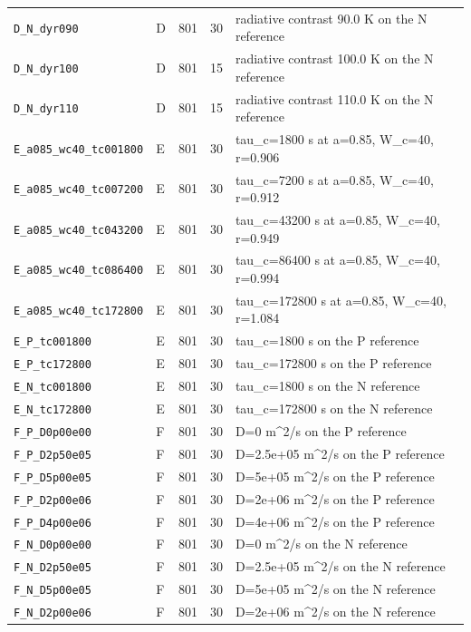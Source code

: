 {\begin{longtable}{llrrp{7.0cm}}
\texttt{D\_N\_dyr090} & D & 801 & 30 & radiative contrast 90.0 K on the N reference\\
\texttt{D\_N\_dyr100} & D & 801 & 15 & radiative contrast 100.0 K on the N reference\\
\texttt{D\_N\_dyr110} & D & 801 & 15 & radiative contrast 110.0 K on the N reference\\
\texttt{E\_a085\_wc40\_tc001800} & E & 801 & 30 & tau\_c=1800 s at a=0.85, W\_c=40, r=0.906\\
\texttt{E\_a085\_wc40\_tc007200} & E & 801 & 30 & tau\_c=7200 s at a=0.85, W\_c=40, r=0.912\\
\texttt{E\_a085\_wc40\_tc043200} & E & 801 & 30 & tau\_c=43200 s at a=0.85, W\_c=40, r=0.949\\
\texttt{E\_a085\_wc40\_tc086400} & E & 801 & 30 & tau\_c=86400 s at a=0.85, W\_c=40, r=0.994\\
\texttt{E\_a085\_wc40\_tc172800} & E & 801 & 30 & tau\_c=172800 s at a=0.85, W\_c=40, r=1.084\\
\texttt{E\_P\_tc001800} & E & 801 & 30 & tau\_c=1800 s on the P reference\\
\texttt{E\_P\_tc172800} & E & 801 & 30 & tau\_c=172800 s on the P reference\\
\texttt{E\_N\_tc001800} & E & 801 & 30 & tau\_c=1800 s on the N reference\\
\texttt{E\_N\_tc172800} & E & 801 & 30 & tau\_c=172800 s on the N reference\\
\texttt{F\_P\_D0p00e00} & F & 801 & 30 & D=0 m\textasciicircum{}2/s on the P reference\\
\texttt{F\_P\_D2p50e05} & F & 801 & 30 & D=2.5e+05 m\textasciicircum{}2/s on the P reference\\
\texttt{F\_P\_D5p00e05} & F & 801 & 30 & D=5e+05 m\textasciicircum{}2/s on the P reference\\
\texttt{F\_P\_D2p00e06} & F & 801 & 30 & D=2e+06 m\textasciicircum{}2/s on the P reference\\
\texttt{F\_P\_D4p00e06} & F & 801 & 30 & D=4e+06 m\textasciicircum{}2/s on the P reference\\
\texttt{F\_N\_D0p00e00} & F & 801 & 30 & D=0 m\textasciicircum{}2/s on the N reference\\
\texttt{F\_N\_D2p50e05} & F & 801 & 30 & D=2.5e+05 m\textasciicircum{}2/s on the N reference\\
\texttt{F\_N\_D5p00e05} & F & 801 & 30 & D=5e+05 m\textasciicircum{}2/s on the N reference\\
\texttt{F\_N\_D2p00e06} & F & 801 & 30 & D=2e+06 m\textasciicircum{}2/s on the N reference\\

\end{longtable}}
